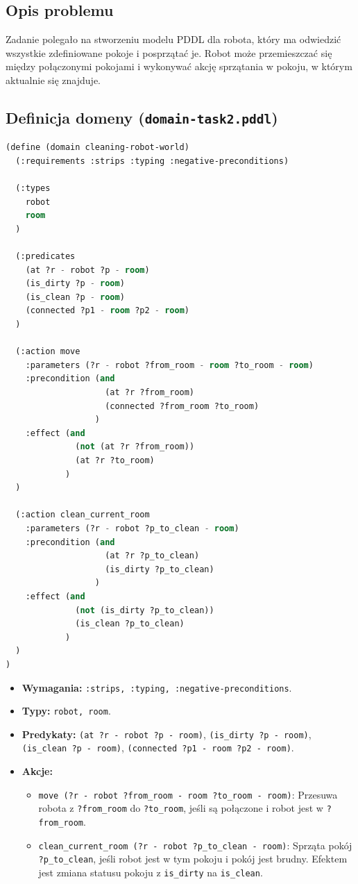 \documentclass[11pt,a4paper]{article}
\begin{document}
\subsection{Opis problemu}
Zadanie polegało na stworzeniu modelu PDDL dla robota, który ma odwiedzić wszystkie zdefiniowane pokoje i posprzątać je. Robot może przemieszczać się między połączonymi pokojami i wykonywać akcję sprzątania w pokoju, w którym aktualnie się znajduje.

\subsection{Definicja domeny (\texttt{domain-task2.pddl})}
\begin{lstlisting}[language=Lisp, style=PDDLstyle]
(define (domain cleaning-robot-world)
  (:requirements :strips :typing :negative-preconditions)

  (:types
    robot
    room
  )

  (:predicates
    (at ?r - robot ?p - room)
    (is_dirty ?p - room)
    (is_clean ?p - room)
    (connected ?p1 - room ?p2 - room)
  )

  (:action move
    :parameters (?r - robot ?from_room - room ?to_room - room)
    :precondition (and
                    (at ?r ?from_room)   
                    (connected ?from_room ?to_room) 
                  )
    :effect (and
              (not (at ?r ?from_room))
              (at ?r ?to_room)       
            )
  )

  (:action clean_current_room 
    :parameters (?r - robot ?p_to_clean - room)
    :precondition (and
                    (at ?r ?p_to_clean) 
                    (is_dirty ?p_to_clean)
                  )
    :effect (and
              (not (is_dirty ?p_to_clean)) 
              (is_clean ?p_to_clean)    
            )
  )
)
\end{lstlisting}

\begin{itemize}
  \item \textbf{Wymagania:} \texttt{:strips, :typing, :negative-preconditions}.
  \item \textbf{Typy:} \texttt{robot, room}.
  \item \textbf{Predykaty:} \texttt{(at ?r - robot ?p - room)}, \texttt{(is\_dirty ?p - room)}, \texttt{(is\_clean ?p - room)}, \texttt{(connected ?p1 - room ?p2 - room)}.
  \item \textbf{Akcje:}
        \begin{itemize}
          \item \texttt{move (?r - robot ?from\_room - room ?to\_room - room)}: Przesuwa robota z \texttt{?from\_room} do \texttt{?to\_room}, jeśli są połączone i robot jest w \texttt{?from\_room}.
          \item \texttt{clean\_current\_room (?r - robot ?p\_to\_clean - room)}: Sprząta pokój \texttt{?p\_to\_clean}, jeśli robot jest w tym pokoju i pokój jest brudny. Efektem jest zmiana statusu pokoju z \texttt{is\_dirty} na \texttt{is\_clean}.
        \end{itemize}
\end{itemize}
\end{document}

